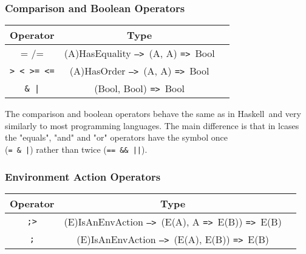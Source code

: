 \documentclass{article}
\def\H{Haskell}
\def\ra{\texttt{=>}\ }
\def\Ra{\texttt{-->}\ }
\begin{document}
\subsubsection{Comparison and Boolean Operators}

\begin{center}
\begin{tabular}{ |c|c|c| } 
\hline
Operator & Type \\ 
\hline
\hline
= /= & (A)HasEquality \Ra (A, A) \ra Bool \\
\hline
\texttt{> < >= <=} & (A)HasOrder \Ra (A, A) \ra Bool \\
\hline
\texttt{\& |} & (Bool, Bool) \ra Bool \\
\hline
\end{tabular}
\end{center}
The comparison and boolean operators behave the same as in \H\ and very
similarly to most programming languages. The main difference is that in lcases
the "equals", "and" and "or" operators have the symbol once \\(\texttt{= \& |})
rather than twice (\texttt{== \&\& ||}).

\subsubsection{Environment Action Operators}

\begin{center}
\begin{tabular}{ |c|c|c| } 
\hline
Operator & Type \\ 
\hline
\hline
\texttt{;>} & (E)IsAnEnvAction \Ra (E(A), A \ra E(B)) \ra E(B) \\
\hline
\texttt{;} & (E)IsAnEnvAction \Ra (E(A), E(B)) \ra E(B) \\
\hline
\end{tabular}
\end{center}
\end{document}
